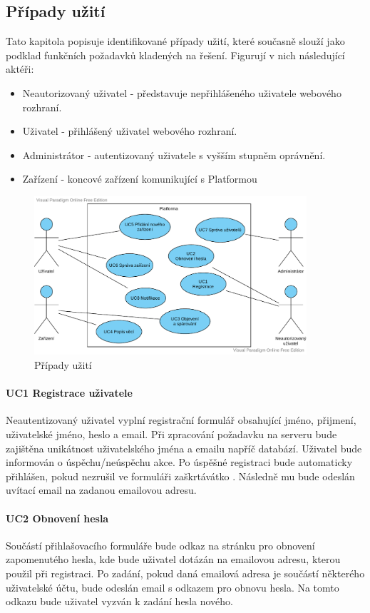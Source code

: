 \subsection{Případy užití}
Tato kapitola popisuje identifikované případy užití, které současně slouží jako podklad funkčních požadavků kladených na řešení. Figurují v nich následující aktéři:
\begin{itemize}
    \item Neautorizovaný uživatel - představuje nepřihlášeného uživatele webového rozhraní.
    \item Uživatel - přihlášený uživatel webového rozhraní.
    \item Administrátor - autentizovaný uživatele s vyšším stupněm oprávnění.
    \item Zařízení - koncové zařízení komunikující s Platformou
\end{itemize}

\begin{figure}[htbp]
    \centering
    \includegraphics[width=0.9\textwidth]{img/use_case.pdf}
    \caption{Případy užití}
\end{figure}

\paragraph{UC1 Registrace uživatele}
Neautentizovaný uživatel vyplní registrační formulář obsahující jméno, přijmení, uživatelské jméno, heslo a email. Při zpracování požadavku na serveru bude zajištěna unikátnost uživatelského jména a emailu napříč databází. Uživatel bude informován o úspěchu/neúspěchu akce. Po úspěšné registraci bude automaticky přihlášen, pokud nezrušil ve formuláři zaškrtávátko . Následně mu bude odeslán uvítací email na zadanou emailovou adresu.

\paragraph{UC2 Obnovení hesla}
Součástí přihlašovacího formuláře bude odkaz na stránku pro obnovení zapomenutého hesla, kde bude uživatel dotázán na emailovou adresu, kterou použil při registraci. Po zadání, pokud daná emailová adresa je součástí některého uživatelské účtu, bude odeslán email s odkazem pro obnovu hesla. Na tomto odkazu bude uživatel vyzván k zadání hesla nového.

